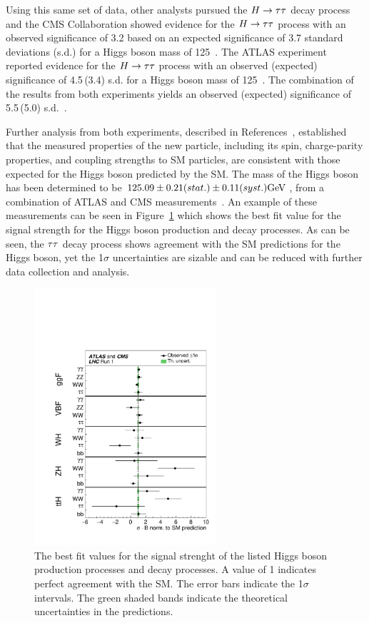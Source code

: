 Using this same set of data, other analysts pursued the $H\to\tau\tau$ decay process and
the CMS Collaboration showed evidence for the $H\to\tau\tau$ process with an observed
significance of 3.2 based on an expected significance of 3.7 standard deviations (s.d.)
for a Higgs boson mass of 125\GeV~\cite{Chatrchyan:2014nva}.
The ATLAS experiment reported evidence for the $H\to\tau\tau$ process 
with an observed (expected) significance of 4.5\,(3.4)
s.d. for a Higgs boson mass of 125\GeV~\cite{Aad:2015vsa}.
The combination of the results from both experiments yields an observed (expected)
significance of 5.5\,(5.0) s.d.~\cite{Khachatryan:2016vau}.

Further analysis from both experiments, described in References~\cite{Aad:2015gba, Khachatryan:2014jba, 
Chatrchyan:2012jja, Aad:2013xqa, Khachatryan:2014kca,Sirunyan:2017exp},
established that the measured properties of the new particle,
including its spin, charge-parity properties, and coupling strengths to SM particles, 
are consistent with those expected for the Higgs boson predicted by the SM.
The mass of the Higgs boson has been determined to be
$125.09\pm0.21(stat.)\pm0.11(syst.)\mathrm{GeV}$, from a combination of
ATLAS and CMS measurements~\cite{Aad:2015zhl}. An example of these measurements
can be seen in Figure~\ref{fig:run_1_comb_mu} which shows the best fit value for the signal
strength for the Higgs boson production and decay processes. As can be seen, the
$\tau\tau$ decay process shows agreement with the SM predictions for the Higgs
boson, yet the 1$\sigma$ uncertainties are sizable and can be reduced with
further data collection and analysis.

\begin{figure}[htbp]
\centering
     \includegraphics[width=0.6\textwidth]{introduction/plots/run_1_comb_mu.pdf}
     \caption{
The best fit values for the signal strenght of the listed Higgs boson production
processes and decay processes. A value of 1 indicates perfect agreement with the SM.
The error bars indicate the 1$\sigma$ intervals. The green shaded bands indicate the
theoretical uncertainties in the predictions.
     }
     \label{fig:run_1_comb_mu}
\end{figure}

